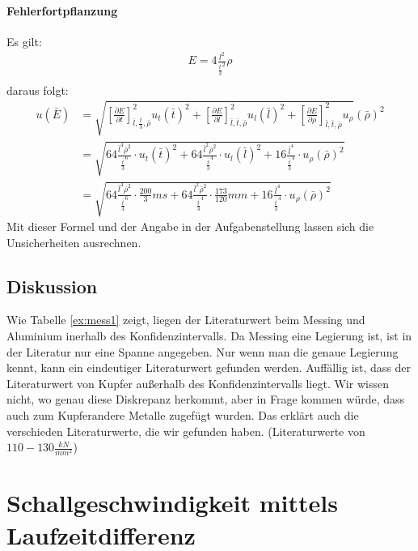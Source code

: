 \documentclass[11pt, a4paper]{article}
\begin{document}
    \paragraph{Fehlerfortpflanzung}
    Es gilt:
    \begin{align}
        E = 4\frac{l^2}{\frac{t}{3}^2} \rho \\
    \end{align}
    daraus folgt:
    \begin{align}
        u(\bar{E}) &= \sqrt{\left[\frac{\partial E}{\partial t}\right]^2_{\bar{l}, \frac{\bar{t}}{3}, \bar{\rho}} u_{t}(\bar{t})^2 +
        \left[\frac{\partial E}{\partial l}\right]^2_{\bar{l}, \bar{t}, \bar{\rho}} u_{l}(\bar{l})^2 +
        \left[\frac{\partial E}{\partial \rho}\right]^2_{\bar{l}, \bar{t}, \bar{\rho}} u_{\rho}}(\bar{\rho})^2 \nonumber \\
        &= \sqrt{64 \frac{\bar{l}^4 \bar{\rho}^2}{\frac{\bar{t}}{3}^6} \cdot u_t(\bar{t})^2 +
        64 \frac{\bar{l}^2 \bar{\rho}^2}{\frac{\bar{t}}{3}^4} \cdot u_l(\bar{l})^2 +
        16 \frac{\bar{l}^4}{\frac{\bar{t}}{3}^4} \cdot u_{\rho}(\bar{\rho})^2
        } \nonumber \\
        &= \sqrt{64 \frac{\bar{l}^4 \bar{\rho}^2}{\frac{\bar{t}}{3}^6} \cdot \frac{200}{3}ms +
        64 \frac{\bar{l}^2 \bar{\rho}^2}{\frac{\bar{t}}{3}^4} \cdot \frac{173}{120}mm +
        16 \frac{\bar{l}^4}{\frac{\bar{t}}{3}^4} \cdot u_{\rho}(\bar{\rho})^2
        }
    \end{align}
    Mit dieser Formel und der Angabe in der Aufgabenstellung lassen
    sich die Unsicherheiten ausrechnen.

    \subsection{Diskussion}
    Wie Tabelle \ref{ex:mess1} zeigt, liegen der Literaturwert beim Messing und Aluminium inerhalb des Konfidenzintervalls.
    Da Messing eine Legierung ist, ist in der Literatur nur eine Spanne angegeben. Nur wenn man die genaue Legierung kennt,
    kann ein eindeutiger Literaturwert gefunden werden.
    Auffällig ist, dass der Literaturwert von Kupfer außerhalb des Konfidenzintervalls liegt. Wir wissen nicht,
    wo genau diese Diskrepanz herkommt, aber in Frage kommen würde, dass auch zum Kupferandere Metalle zugefügt wurden. Das erklärt auch 
    die verschieden Literaturwerte, die wir gefunden haben. (Literaturwerte von $110-130\frac{kN}{mm^2}$)

    \section{Schallgeschwindigkeit mittels Laufzeitdifferenz}
\end{document}
